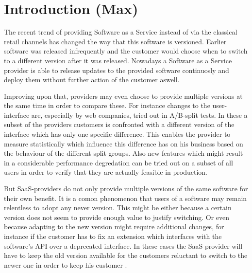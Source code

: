 \section{Introduction (Max)}

The recent trend of providing Software as a Service instead of via the classical retail channels has changed the way that this software is versioned.
Earlier software was released infrequently and the customer would choose when to switch to a different version after it was released.
Nowadays a Software as a Service provider is able to release updates to the provided software continuosly and deploy them without further action of the customer aswell.

Improving upon that, providers may even choose to provide multiple versions at the same time in order to compare these.
For instance changes to the user-interface are, especially by web companies, tried out in A/B-split tests.
In these a subset of the providers customers is confronted with a different version of the interface which has only one specific difference.
This enables the provider to measure statistically which influence this difference has on his business based on the behaviour of the different split groups.
Also new features which might result in a considerable performance degredation can be tried out on a subset of all users in order to verify that they are actually feasible in production.

But SaaS-providers do not only provide multiple versions of the same software for their own benefit.
It is a comon phenomenon that users of a software may remain relentless to adopt any never version.
This might be either because a certain version does not seem to provide enough value to justify switching.
Or even because adapting to the new version might require additional changes, for instance if the customer has to fix an extension which interfaces with the software's API over a deprecated interface.
In these cases the SaaS provider will have to keep the old version available for the customers reluctant to switch to the newer one in order to keep his customer .
